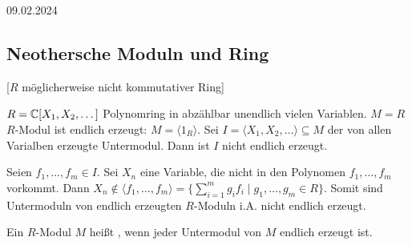 \documentclass[../main.tex]{subfiles}
\begin{document}
\begin{flushright}
    09.02.2024
\end{flushright}
\subsection{Neothersche Moduln und Ring}
[$R$ möglicherweise nicht kommutativer Ring]
\begin{example}\label{theo:5.40}
    $R=\mathbb{C}[X_1, X_2,\dots]$ Polynomring in abzählbar unendlich vielen Variablen.
    $M=R$ $R$-Modul ist endlich erzeugt: $M=\langle 1_R\rangle$.
    Sei $I=\langle X_1, X_2,\dots \rangle\subseteq M$ der von allen Varialben erzeugte Untermodul.
    Dann ist $I$ nicht endlich erzeugt.
    
    Seien $f_1, \dots, f_m\in I$. Sei $X_n$ eine Variable, die nicht in den Polynomen $f_1,\dots, f_m$  vorkommt.
    Dann $X_n\notin \langle f_1,\dots,f_m\rangle = \{\sum_{i=1}^m g_i f_i \mid g_1,\dots, g_m\in R\}$.
    Somit sind Untermoduln von endlich erzeugten $R$-Moduln i.A. nicht endlich erzeugt.
\end{example}

\begin{definition}
    Ein $R$-Modul $M$ heißt , wenn jeder Untermodul von $M$ endlich erzeugt ist.
\end{definition}
\end{document}
